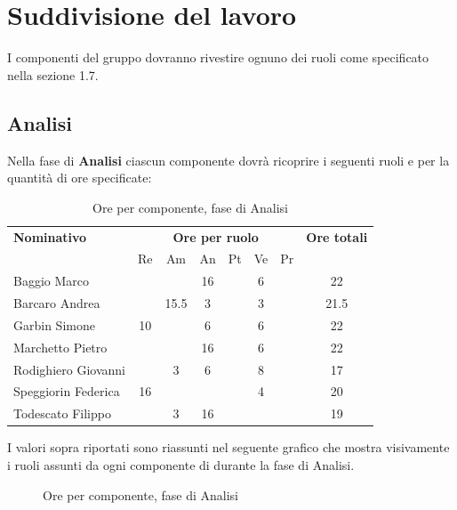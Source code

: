 \section{Suddivisione del lavoro}
I componenti del gruppo dovranno rivestire ognuno dei ruoli come specificato nella sezione
1.7.
\subsection{Analisi}
Nella fase di \textbf{Analisi} ciascun componente dovrà ricoprire i seguenti ruoli e per la quantità di ore specificate:

\begin{table}[H]
\centering
\begin{tabular}{|l|c|c|c|c|c|c|c|}
\hline
\textbf{Nominativo} & 
\multicolumn{6}{c|}{\textbf{Ore per ruolo}} & 
\textbf{Ore totali} \\
& Re & Am & An  & Pt & Ve & Pr & \\
\hline
Baggio Marco
  & 
  & 
  & 16
  & 
  & 6
  & 
  &
  22
  \\
Barcaro Andrea
  & 
  & 15.5
  & 3
  & 
  & 3
  & 
  &
 21.5
  \\
Garbin Simone
  & 10
  & 
  & 6
  & 
  & 6
  & 
  &
  22
  \\
Marchetto Pietro
  & 
  & 
  & 16
  & 
  & 6
  & 
  &
  22
  \\
Rodighiero Giovanni
  & 
  & 3
  & 6
  & 
  & 8
  & 
  &
  17
  \\
Speggiorin Federica
  & 16
  & 
  & 
  & 
  & 4
  & 
  &
  20
  \\
Todescato Filippo
  & 
  & 3
  & 16
  & 
  & 
  & 
  &
  19
  \\
\hline
\end{tabular}
\caption{Ore per componente, fase di Analisi}
\end{table}
I valori sopra riportati sono riassunti nel seguente grafico che mostra visivamente i ruoli assunti da ogni componente di \GroupName{} durante la fase di Analisi.
\begin{figure}[H]
\centering
{}
\caption{Ore per componente, fase di Analisi}
\end{figure}


